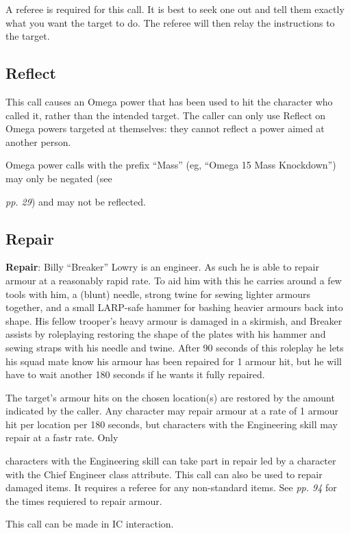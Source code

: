 A referee is required for this call. It is best to seek one out and tell them exactly what you want the target to do. The referee will then relay the instructions to the target.

\subsection{Reflect}

This call causes an Omega power that has been used to hit the character who called it, rather than the intended target. The caller can only use Reflect on Omega powers targeted at themselves: they cannot reflect a power aimed at another person.

Omega power calls with the prefix ``Mass'' (eg, ``Omega 15 Mass Knockdown'') may only be negated (see

\textit{pp. 29}) and may not be reflected.

\subsection{Repair}

\textbf{Repair}: Billy ``Breaker'' Lowry is an engineer. As such he is able to repair armour at a reasonably rapid rate. To aid him with this he carries around a few tools with him, a (blunt) needle, strong twine for sewing lighter armours together, and a small LARP-safe hammer for bashing heavier armours back into shape. His fellow trooper's heavy armour is damaged in a skirmish, and Breaker assists by roleplaying restoring the shape of the plates with his hammer and sewing straps with his needle and twine. After 90 seconds of this roleplay he lets his squad mate know his armour has been repaired for 1 armour hit, but he will have to wait another 180 seconds if he wants it fully repaired.

The target's armour hits on the chosen location(s) are restored by the amount indicated by the caller. Any character may repair armour at a rate of 1 armour hit per location per 180 seconds, but characters with the Engineering skill may repair at a fastr rate. Only

characters with the Engineering skill can take part in repair led by a character with the Chief Engineer class attribute. This call can also be used to repair damaged items. It requires a referee for any non-standard items. See \textit{pp. 94} for the times requiered to repair armour.

This call can be made in IC interaction.

